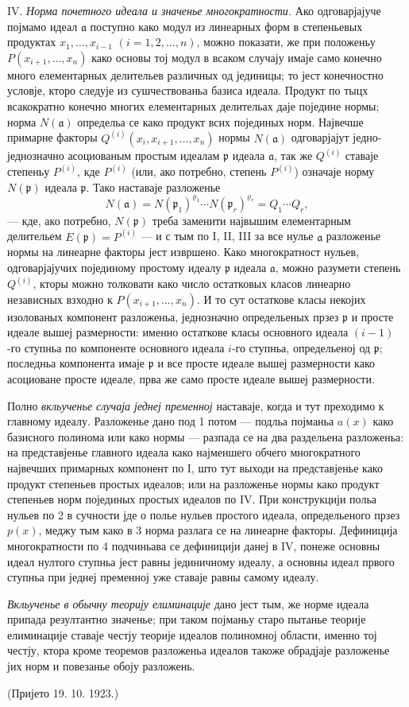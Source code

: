﻿\documentclass[11pt]{article}
\providecommand{\fraka}{\mathfrak a}
\providecommand{\frakp}{\mathfrak p}
\begin{document}
\noindent IV. \emph{Норма почетного идеала и значенье многократности.} Ако одговарјајуче појмамо идеал $\fraka$ поступно како модул из линеарных форм в степеньевых продуктах $x_1,\ldots,x_{i-1}$ $(i=1,2,\ldots,n)$, можно показати, же при положеньу $P(x_{i+1},\ldots,x_n)$ како основы тој модул в всаком случају имаје само конечно много елементарных делительев различных од јединицы; то јест конечностно условје, кторо следује из сушчествованьа базиса идеала. Продукт по тыцх всакократно конечно многих елементарных делительах даје поједине нормы; норма $N(\fraka)$ определьа се како продукт всих појединых норм. Највечше примарне факторы $Q^{(i)}(x_i,x_{i+1},\ldots,x_n)$ нормы $N(\fraka)$ одговарјајут једно-једнозначно асоциованым простым идеалам $\frakp$ идеала $\fraka$, так же $Q^{(i)}$ ставаје степеньу $P^{(i)}$, кде $P^{(i)}$ (или, ако потребно, степень $P^{(i)}$) означаје норму $N(\frakp)$ идеала $\frakp$. Тако наставаје разложенье
\[
 N(\fraka)=N(\frakp_1)^{\varrho_1}\cdots N(\frakp_r)^{\varrho_r}=Q_1\cdots Q_r,
\]
--- кде, ако потребно, $N(\frakp)$ треба заменити највышим елементарным делительем $E(\frakp)=P^{(i)}$ --- и с тым по I, II, III за все нулье $\fraka$ разложенье нормы на линеарне факторы јест извршено. Како многократност нульев, одговарјајучих појединому простому идеалу $\frakp$ идеала $\fraka$, можно разумети степень $Q^{(i)}$, кторы можно толковати како число остатковых класов линеарно независных взходно к $P(x_{i+1},\ldots,x_n)$. И то сут остаткове класы некојих изолованых компонент разложеньа, једнозначно определьеных прзез $\frakp$ и просте идеале вышеј размерности: именно остаткове класы основного идеала $(i-1)$-го ступньа по компоненте основного идеала $i$-го ступньа, определьеној од $\frakp$; последньа компонента имаје $\frakp$ и все просте идеале вышеј размерности како асоциоване просте идеале, прва же само просте идеале вышеј размерности.

Полно \emph{вкльученье случаја једнеј пременној} наставаје, когда и тут преходимо к главному идеалу. Разложенье дано под 1 потом --- подльа појманьа $a(x)$ како базисного полинома или како нормы --- разпада се на два раздельена разложеньа: на представјенье главного идеала како најменшего обчего многократного највечших примарных компонент по I, што тут выходи на представјенье како продукт степеньев простых идеалов; или на разложенье нормы како продукт степеньев норм појединых простых идеалов по IV. При конструкцији польа нульев по 2 в сучности јде о полье нульев простого идеала, определьеного прзез $p(x)$, меджу тым како в 3 норма разлага се на линеарне факторы. Дефиниција многократности по 4 подчиньава се дефиницији данеј в IV, понеже основны идеал нултого ступньа јест равны јединичному идеалу, а основны идеал првого ступньа при једнеј пременној уже ставаје равны самому идеалу.

\emph{Вкльученье в обычну теорију елиминације} дано јест тым, же норме идеала припада резултантно значенье; при таком појманьу старо пытанье теорије елиминације ставаје честју теорије идеалов полиномној области, именно тој честју, ктора кроме теоремов разложеньа идеалов такоже обрадјаје разложенье јих норм и повезанье обоју разложень.

\begin{center}
(Пријето 19. 10. 1923.)
\end{center}
\end{document}
